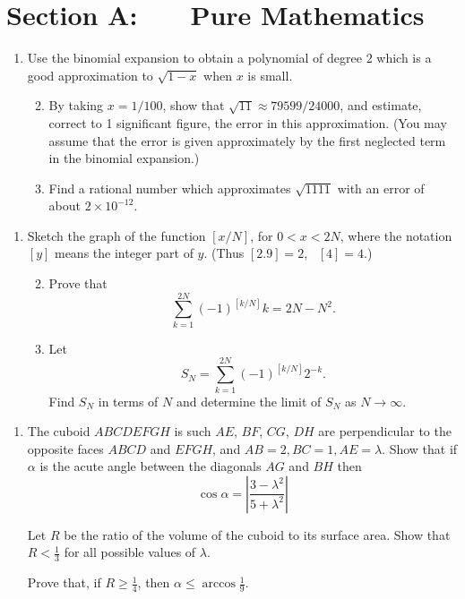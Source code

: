 \documentclass[a4, 11pt]{report}
\newlength{\qspace}
\newcounter{qnumber}
\newenvironment{question}%
 {\vspace{\qspace}
  \begin{enumerate}[\bfseries 1\quad][10]%
    \setcounter{enumi}{\value{qnumber}}%
    \item%
 }
{
  \end{enumerate}
  \filbreak
  \stepcounter{qnumber}
 }
\newenvironment{questionparts}[1][1]%
 {
  \begin{enumerate}[\bfseries (i)]%
    \setcounter{enumii}{#1}
    \addtocounter{enumii}{-1}
    \setlength{\itemsep}{5mm}
    \setlength{\parskip}{8pt}
 }
 {
  \end{enumerate}
 }
\def\le{\leqslant}
\def\ge{\geqslant}
\begin{document}
\setcounter{page}{2}

 
\section*{Section A: \ \ \ Pure Mathematics}

\begin{question}
 Use the binomial expansion to obtain
  a polynomial of degree $2$ which is a good approximation
 to $\sqrt{1-x}$ when $x$ is small.  

 \begin{questionparts}

 \item
 By taking  $x=1/100$, show that $\sqrt{11}\approx79599/24000$,
 and estimate, correct to 1 significant figure, 
 the error in this approximation. (You may assume that the error is given approximately by the 
 first neglected term in the binomial expansion.)


 \item
 Find a rational number which approximates  $\sqrt{1111}$ with an error
 of about  $2 \times {10}^{-12}$.
 \end{questionparts}
\end{question}

\begin{question}
Sketch the graph of the function $[x/N]$, for $0<x<2N$, where 
the notation  $[y]$ means the integer part of $y$.
(Thus $[2.9] = 2$, \ $[4]=4$.) 

\begin{questionparts}
\item Prove that 
\[
\sum_{k=1}^{2N} (-1)^{[k/N]} k = 2N-N^2.
\]
\item Let
\[
S_N = \sum_{k=1}^{2N} (-1)^{[k/N]} 2^{-k}.
\]
Find  $S_N$ in terms of $N$ and determine the limit of $S_N$ as  $N\to\infty$.
\end{questionparts}
\end{question}

\begin{question}
The cuboid $ABCDEFGH$ is such  $AE$, $BF$, $CG$, $DH$ are perpendicular 
to the opposite faces $ABCD$ and $EFGH$, and $AB =2, BC=1, 
AE={\lambda}$. Show that if $\alpha$ is the acute angle between the
diagonals $AG$ and $BH$ then 
$$
\cos {\alpha} 
= \left \vert \frac {3-{\lambda}^2} {5+{\lambda}^2} \right \vert
$$

Let $R$ be the ratio of the volume of the cuboid to its surface area. Show that
$R<\frac{1}{3}$ for all possible
values of $\lambda$.

Prove that, if $R\ge \frac{1}{4}$, then $\alpha \le \arccos \frac{1}{9}$.
\end{question}
\end{document}
